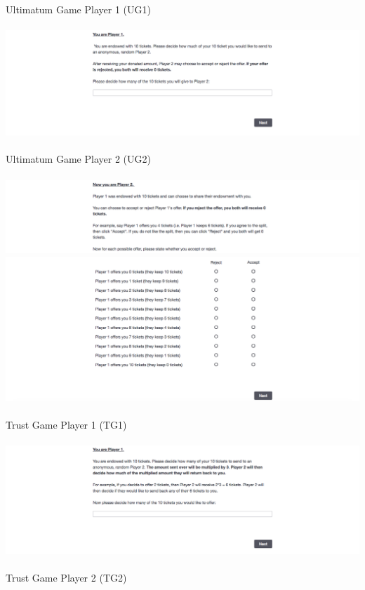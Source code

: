 \documentclass[12pt]{article}
\begin{document}
\noindent Ultimatum Game Player 1 (UG1) \\ \\ 
\includegraphics[scale=0.35]{ultimatum1} \\ \\
\noindent Ultimatum Game Player 2 (UG2) \\ \\
\includegraphics[scale=0.35]{ultimatum2} \\
\includegraphics[scale=0.35]{ultimatum3} \\ \\
\noindent Trust Game Player 1 (TG1) \\ \\
\includegraphics[scale=0.35]{trust1} \\ \\
\noindent Trust Game Player 2 (TG2) \\ \\
\end{document}
